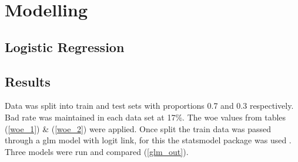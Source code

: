 \chapter{Modelling} \label{cha:chapter-3}

\section{Logistic Regression}

\section{Results}

Data was split into train and test sets with proportions 0.7 and 0.3 respectively. Bad rate was maintained in each data set at 17\%. The woe values from tables  (\ref{woe_1}) \& (\ref{woe_2}) were applied. Once split the train data was passed through a glm model with logit link, for this the statsmodel package was used \cite{statsmodels}. Three models were run and compared  (\ref{glm_out}).  

